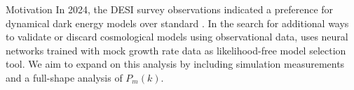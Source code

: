 \begin{block}{Motivation}
    In 2024, the DESI survey observations indicated a preference for dynamical dark energy models over standard \lcdm \cite{adame2025desi}. In the search for additional ways to validate or discard cosmological models using observational data, \cite{ocampo2025enhancing} uses neural networks trained with mock growth rate data as likelihood-free model selection tool. We aim to expand on this analysis by including simulation measurements and a full-shape analysis of $P_m(k)$.
\end{block}